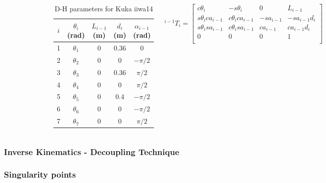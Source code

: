 \begin{frame}
\begin{columns}
\begin{figure}[htbp]
\end{figure}
\begin{table}[htbp]
\begin{center}
\begin{tabular}{ |c|c|c|c|c| } 
\hline
$i$ & $θ_i$ (rad) & $L_{i-1}$ (m) & $d_i$ (m) & $α_{i-1}$ (rad) \\
\hline
1 & $θ_1$ & 0 & 0.36 & 0 \\
2 & $θ_2$ & 0 & 0 & $-π/2$ \\
3 & $θ_3$ & 0 & 0.36 & $π/2$ \\
4 & $θ_4$ & 0 & 0 & $π/2$\\
5 & $θ_5$ & 0 & 0.4 & $-π/2$ \\
6 & $θ_6$ & 0 & 0 & $-π/2$ \\
7 & $θ_7$ & 0 & 0 & $π/2$ \\
\hline
\end{tabular}
\end{center}
\caption{D-H parameters for Kuka iiwa14}
\end{table}
\[
^{i-1}T_i = 
\begin{bmatrix}
c\theta_i & -s\theta_i & 0 & L_{i-1} \\
s\theta_ica_{i-1} & c\theta_ica_{i-1} & -sa_{i-1} & -sa_{i-1}d_i \\
s\theta_isa_{i-1} & c\theta_isa_{i-1} & ca_{i-1} & ca_{i-1}d_i \\
0 & 0 & 0 & 1\\
\end{bmatrix}
\]
\end{columns}
\end{frame}

\begin{frame}
\frametitle{Inverse Kinematics - Decoupling Technique}
\end{frame}

\begin{frame}
\frametitle{Singularity points}
\end{frame}

